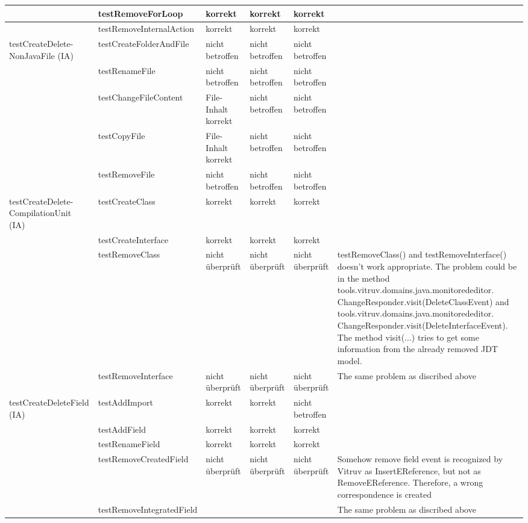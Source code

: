 \begin{tiny}
\begin{longtable}[c]{|p{2.2cm}|p{3.5cm}|p{1cm}|p{1cm}|p{1cm}|p{4cm}|}
 & testRemoveForLoop & korrekt & korrekt & korrekt &  \\ \hline
 & testRemoveInternalAction & korrekt & korrekt & korrekt &  \\ \hline
testCreateDelete- NonJavaFile 			(IA) & testCreateFolderAndFile & nicht 			betroffen & nicht 			betroffen & nicht 			betroffen &  \\ \hline
 & testRenameFile & nicht 			betroffen & nicht 			betroffen & nicht 			betroffen &  \\ \hline
 & testChangeFileContent & File-Inhalt 			korrekt & nicht 			betroffen & nicht 			betroffen &  \\ \hline
 & testCopyFile & File-Inhalt 			korrekt & nicht 			betroffen & nicht 			betroffen &  \\ \hline
 & testRemoveFile & nicht 			betroffen & nicht 			betroffen & nicht 			betroffen &  \\ \hline
testCreateDelete- CompilationUnit 			(IA) & testCreateClass & korrekt & korrekt & korrekt &  \\ \hline
 & testCreateInterface & korrekt & korrekt & korrekt &  \\ \hline
 & testRemoveClass & nicht 			überprüft & nicht 			überprüft & nicht 			überprüft & testRemoveClass() and testRemoveInterface() doesn't work appropriate. The problem could be in the method tools.vitruv.domains.java.monitorededitor. ChangeResponder.visit(DeleteClassEvent) and tools.vitruv.domains.java.monitorededitor. ChangeResponder.visit(DeleteInterfaceEvent). The method visit(...) tries to get some information from the already removed JDT model. \\ \hline
 & testRemoveInterface & nicht 			überprüft & nicht 			überprüft & nicht 			überprüft & The 			same problem as discribed above \\ \hline
testCreateDeleteField 			(IA) & testAddImport & korrekt & korrekt & nicht 			betroffen &  \\ \hline
 & testAddField & korrekt & korrekt & korrekt &  \\ \hline
 & testRenameField & korrekt & korrekt & korrekt &  \\ \hline
 & testRemoveCreatedField & nicht 			überprüft & nicht 			überprüft & nicht 			überprüft & Somehow remove field event is recognized by Vitruv as InsertEReference, but not as RemoveEReference. Therefore, a wrong correspondence is created \\ \hline
 & testRemoveIntegratedField &  &  &  & The same problem as discribed above \\ \hline

\end{longtable}
\end{tiny}
